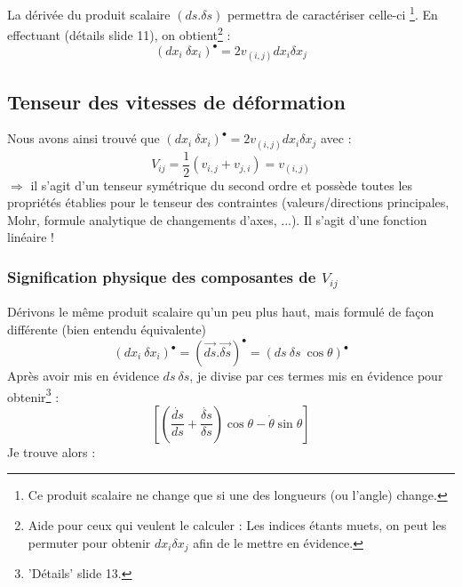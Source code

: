 La dérivée du produit scalaire $(ds.\delta s)$ permettra de caractériser celle-ci
\footnote{Ce produit scalaire ne change que si une des longueurs (ou l'angle) change.}. En
effectuant (détails slide 11), on obtient\footnote{Aide pour ceux qui veulent le calculer :
	Les indices étants muets, on peut les permuter pour obtenir $dx_i\delta x_j$ afin de le
mettre en évidence.} :
\begin{equation}
	(dx_i\ \delta x_i)^\bullet = 2v_{(i,j)} dx_i\delta x_j
\end{equation}
         
         
\subsection{Tenseur des vitesses de déformation}
Nous avons ainsi trouvé que $(dx_i\ \delta x_i)^\bullet = 2v_{(i,j)} dx_i\delta x_j$ avec :
\begin{equation}
	V_{ij} = \frac{1}{2}(v_{i,j} + v_{j,i}) = v_{(i,j)}
\end{equation}
$\Rightarrow$ il s'agit d'un tenseur symétrique du second ordre et possède toutes les propriétés
établies pour le tenseur des contraintes (valeurs/directions principales, Mohr, formule analytique
de changements d'axes, ...). Il s'agit d'une fonction linéaire !
    
    
\subsubsection{Signification physique des composantes de $V_{ij}$}
Dérivons le même produit scalaire qu'un peu plus haut, mais formulé de façon différente (bien
entendu équivalente)
\begin{equation}
	(dx_i\ \delta x_i)^\bullet = (\vec{ds}.\vec{\delta s})^\bullet = (ds\ \delta s \ \cos
	\theta)^\bullet
\end{equation}
Après avoir mis en évidence $ds\ \delta s$, je divise par ces termes mis en évidence pour 
obtenir\footnote{'Détails' slide 13.} :
\begin{equation}
	\left[\left( \dfrac{\dot{ds}}{ds}+\dfrac{\dot{\delta s}}{\delta s}\right)\cos\theta - \dot{
		\theta}\sin\theta\right]
\end{equation}
Je trouve alors :\\
        
       
